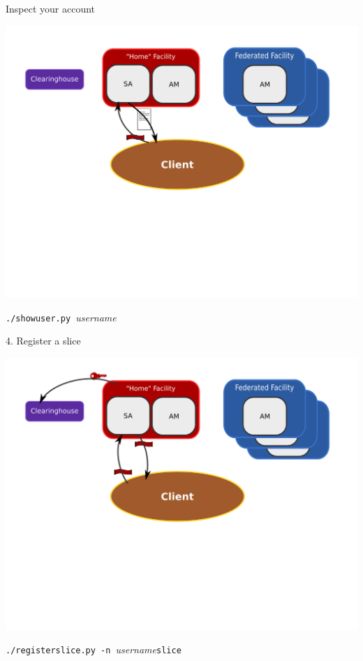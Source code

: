 \documentclass[landscape]{slides}
\newcommand{\heading}[1]{{\fontseries{b}\selectfont\begin{center}{\LARGE\color{red} #1}\end{center}}}
\begin{document}
\begin{slide}
\heading{Inspect your account}
\begin{center}
\includegraphics[width=15cm]{tutorial-diagram-7}
\end{center}
\vspace{-4cm}
\begin{center}{\tt ./showuser.py }\emph{username}\end{center}
\end{slide}

\begin{slide}
\heading{4. Register a slice}
\begin{center}
\includegraphics[width=15cm]{tutorial-diagram-2}
\end{center}
\vspace{-4cm}
\begin{center}{\tt ./registerslice.py -n }\emph{username}{\tt slice}\end{center}
\end{slide}
\end{document}
